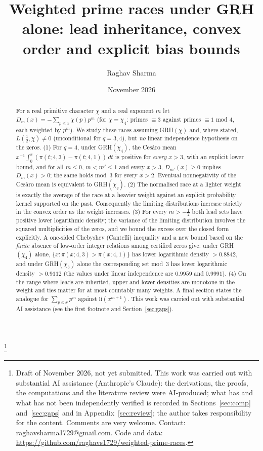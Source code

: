 \documentclass[11pt]{amsart}
\theoremstyle{definition}
\numberwithin{equation}{section}
\begin{document}
\title[Weighted prime races under GRH alone]{Weighted prime races
under GRH alone: lead inheritance, convex order and explicit bias
bounds}

\author{Raghav Sharma}
\thanks{Draft of November 2026, not yet submitted. This work was
carried out with substantial AI assistance (Anthropic's Claude): the
derivations, the proofs, the computations and the literature review
were AI-produced; what has and what has not been independently
verified is recorded in Sections~\ref{sec:comp} and~\ref{sec:gaps}
and in Appendix~\ref{sec:review}; the author takes responsibility for
the content. Comments are very welcome. Contact:
raghavsharma1729@gmail.com. Code and data:
\url{https://github.com/raghavs1729/weighted-prime-races}.}
\date{November 2026}

\begin{abstract}
For a real primitive character $\chi$ and a real exponent $m$ let
$D_m(x)=-\sum_{p\le x}\chi(p)p^m$ (for $\chi=\chi_4$: primes
$\equiv3$ against primes $\equiv1$ mod $4$, each weighted by $p^m$).
We study these races assuming GRH$(\chi)$ and, where stated,
$L(\tfrac12,\chi)\ne0$ (unconditional for $q=3,4$), but \emph{no}
linear independence hypothesis on the zeros.
(1) For $q=4$, under GRH$(\chi_4)$, the Ces\`aro mean
$x^{-1}\int_0^x(\pi(t;4,3)-\pi(t;4,1))\,dt$ is positive for
\emph{every} $x>3$, with an explicit lower bound, and for all
$m\le0$, $m<m'\le1$ and every $x>3$, $D_{m'}(x)\ge0$ implies
$D_m(x)>0$; the same holds mod~$3$ for every $x>2$. Eventual
nonnegativity of the Ces\`aro mean is equivalent to GRH$(\chi_q)$.
(2) The normalised race at a lighter weight is exactly the average of
the race at a heavier weight against an explicit probability kernel
supported on the past. Consequently the limiting distributions
increase strictly in the convex order as the weight increases.
(3) For every $m>-\tfrac12$ both lead sets have positive lower
logarithmic density; the variance of the limiting distribution
involves the squared multiplicities of the zeros, and we bound the
excess over the closed form explicitly. A one-sided Chebyshev
(Cantelli) inequality and a new bound based on the \emph{finite}
absence of low-order integer relations among certified zeros give:
under GRH$(\chi_4)$ alone, $\{x:\pi(x;4,3)>\pi(x;4,1)\}$ has lower
logarithmic density $>0.8842$, and under GRH$(\chi_3)$ alone the
corresponding set mod~$3$ has lower logarithmic density $>0.9112$
(the values under linear independence are $0.9959$ and $0.9991$).
(4) On the range where leads are inherited, upper and lower densities
are monotone in the weight and ties matter for at most countably many
weights. A final section states the analogue for
$\sum_{p\le x}p^m$ against $\mathrm{li}(x^{m+1})$. This work was
carried out with substantial AI assistance (see the first footnote
and Section~\ref{sec:gaps}).
\end{abstract}
\end{document}
